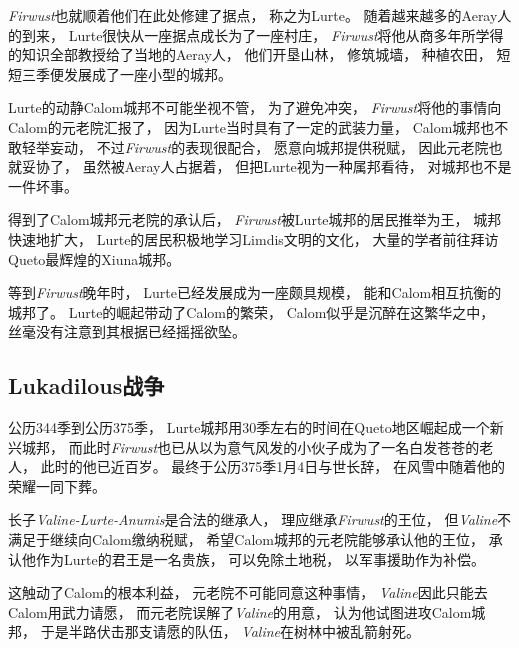 \documentclass[UTF8,12pt,draft]{ctexbook}
\begin{document}
                \emph{Firwust}也就顺着他们在此处修建了据点，
                称之为Lurte。
                随着越来越多的Aeray人的到来，
                Lurte很快从一座据点成长为了一座村庄，
                \emph{Firwust}将他从商多年所学得的知识全部教授给了当地的Aeray人，
                他们开垦山林，
                修筑城墙，
                种植农田，
                短短三季便发展成了一座小型的城邦。

                Lurte的动静Calom城邦不可能坐视不管，
                为了避免冲突，
                \emph{Firwust}将他的事情向Calom的元老院汇报了，
                因为Lurte当时具有了一定的武装力量，
                Calom城邦也不敢轻举妄动，
                不过\emph{Firwust}的表现很配合，
                愿意向城邦提供税赋，
                因此元老院也就妥协了，
                虽然被Aeray人占据着，
                但把Lurte视为一种属邦看待，
                对城邦也不是一件坏事。

                得到了Calom城邦元老院的承认后，
                \emph{Firwust}被Lurte城邦的居民推举为王，
                城邦快速地扩大，
                Lurte的居民积极地学习Limdis文明的文化，
                大量的学者前往拜访Queto最辉煌的Xiuna城邦。

                等到\emph{Firwust}晚年时，
                Lurte已经发展成为一座颇具规模，
                能和Calom相互抗衡的城邦了。
                Lurte的崛起带动了Calom的繁荣，
                Calom似乎是沉醉在这繁华之中，
                丝毫没有注意到其根据已经摇摇欲坠。
            \subsection{Lukadilous战争}
                公历344季到公历375季，
                Lurte城邦用30季左右的时间在Queto地区崛起成一个新兴城邦，
                而此时\emph{Firwust}也已从以为意气风发的小伙子成为了一名白发苍苍的老人，
                此时的他已近百岁。
                最终于公历375季1月4日与世长辞，
                在风雪中随着他的荣耀一同下葬。

                长子\emph{Valine-Lurte-Anumis}是合法的继承人，
                理应继承\emph{Firwust}的王位，
                但\emph{Valine}不满足于继续向Calom缴纳税赋，
                希望Calom城邦的元老院能够承认他的王位，
                承认他作为Lurte的君王是一名贵族，
                可以免除土地税，
                以军事援助作为补偿。

                这触动了Calom的根本利益，
                元老院不可能同意这种事情，
                \emph{Valine}因此只能去Calom用武力请愿，
                而元老院误解了\emph{Valine}的用意，
                认为他试图进攻Calom城邦，
                于是半路伏击那支请愿的队伍，
                \emph{Valine}在树林中被乱箭射死。
\end{document}
